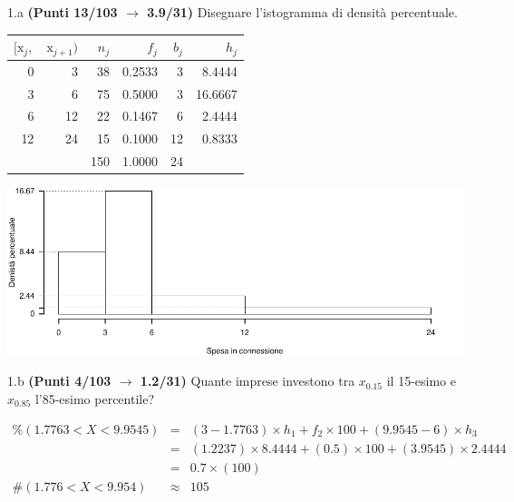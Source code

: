 \documentclass[
  11pt,
]{book}
\theoremstyle{mytheoremstyle}
\theoremstyle{mydefstyle}
\newenvironment{sol}
  {
  \begin{tcolorbox}[enhanced,breakable,arc=0.1mm,boxrule=1pt,colback=white,colframe=iblue,
  title=\bf \fontfamily{lmss}\selectfont \hspace{.5 cm} Soluzione,drop fuzzy shadow]

}{
\end{tcolorbox}
  }
\begin{document}
1.a \textbf{(Punti 13/103 \(\rightarrow\) 3.9/31)} Disegnare l'istogramma di densità percentuale.

\begin{sol}

\begin{table}[H]
\centering
\begin{tabular}{rrrrrr}
\toprule
$[\text{x}_j,$ & $\text{x}_{j+1})$ & $n_j$ & $f_j$ & $b_j$ & $h_j$\\
\midrule
0 & 3 & 38 & 0.2533 & 3 & 8.4444\\
3 & 6 & 75 & 0.5000 & 3 & 16.6667\\
6 & 12 & 22 & 0.1467 & 6 & 2.4444\\
12 & 24 & 15 & 0.1000 & 12 & 0.8333\\
 &  & 150 & 1.0000 & 24 & \\
\bottomrule
\end{tabular}
\end{table}

\begin{center}\includegraphics{Esami_passati_con_soluzioni_files/figure-latex/unnamed-chunk-26-1} \end{center}

\end{sol}

1.b \textbf{(Punti 4/103 \(\rightarrow\) 1.2/31)} Quante imprese investono tra \(x_{0.15}\) il 15-esimo e \(x_{0.85}\) l'85-esimo percentile?

\begin{sol}
\begin{eqnarray*} \%(1.7763<X<9.9545) &=& (3-1.7763)\times h_{1}+ f_{ 2 }\times 100 + (9.9545-6)\times h_{3}  \\ 
 &=& (1.2237)\times 8.4444+ ( 0.5 )\times 100 + (3.9545)\times 2.4444  \\ 
 &=&  0.7 \times(100)\\
     \#( 1.776 < X < 9.954 ) &\approx& 105 
         \end{eqnarray*}

\end{sol}
\end{document}
